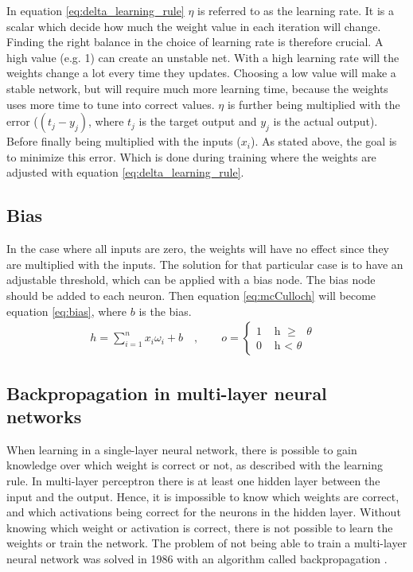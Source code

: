 \documentclass[USenglish]{ifimaster}  %
\begin{document}
In equation \ref{eq:delta_learning_rule} $\eta$ is referred to as the learning rate. It is a scalar which decide how much the weight value in each iteration will change. Finding the right balance in the choice of learning rate is therefore crucial. A high value (e.g. 1) can create an unstable net. With a high learning rate will the weights change a lot every time they updates. %
Choosing a low value will make a stable network, but will require much more learning time, because the weights uses more time to tune into correct values.
\newline
\newline
$\eta$ is further being multiplied with the error ($(t_j - y_j)$, where $t_j$ is the target output and $y_j$ is the actual output). Before finally being multiplied with the inputs ($x_i$). As stated above, the goal is to minimize this error. Which is done during training where the weights are adjusted with equation \ref{eq:delta_learning_rule}.
\subsection{Bias}
In the case where all inputs are zero, the weights will have no effect since they are multiplied with the inputs. The solution for that particular case is to have an adjustable threshold, which can be applied with a bias node. The bias node should be added to each neuron. Then equation \ref{eq:mcCulloch} will become equation \ref{eq:bias}, where $b$ is the bias.
\begin{equation}\label{eq:bias}
\begin{aligned}
    {h = \sum_{i=1}^{n} x_i \omega_i + b \quad , \quad\quad o = 
\begin{cases}
    1 & \text{ h $\geq$ $\theta$ }  \\
    0 & \text{ h < $\theta$ }
\end{cases}}
\end{aligned}
\end{equation}
\subsection{Backpropagation in multi-layer neural networks}
When learning in a single-layer neural network, there is possible to gain knowledge over which weight is correct or not, as described with the learning rule. In multi-layer perceptron there is at least one hidden layer between the input and the output. Hence, it is impossible to know which weights are correct, and which activations being correct for the neurons in the hidden layer. Without knowing which weight or activation is correct, there is not possible to learn the weights or train the network. The problem of not being able to train a multi-layer neural network was solved in 1986 with an algorithm called backpropagation \cite{Rumelhart:1986:LIR:104279.104293}.
\end{document}
